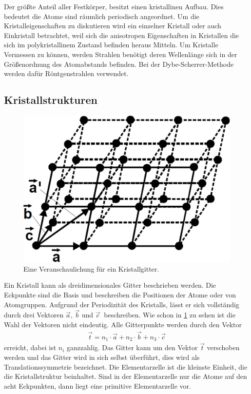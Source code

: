 Der größte Anteil aller Festkörper, besitzt einen kristallinen Aufbau. Dies bedeutet die Atome sind räumlich periodisch angeordnet. Um die Kristalleigenschaften zu diskutieren wird ein einzelner Kristall oder auch Einkristall betrachtet, weil sich die anisotropen Eigenschaften in Kristallen die sich im polykristallinem Zustand befinden heraus Mitteln. Um Kristalle Vermessen zu können, werden Strahlen benötigt deren Wellenlänge sich in der Größenordnung des Atomabstands befinden. Bei der Dybe-Scherrer-Methode werden dafür Röntgenstrahlen verwendet.
\subsection{Kristallstrukturen}
\begin{figure}[h!]
	\centering
	\includegraphics[scale = 0.4]{../Grafiken/Gitter.pdf}
	\caption{Eine Veranschaulichung für ein Kristallgitter.\cite{V41}}
	\label{fig:BeispielGitter}
\end{figure}
Ein Kristall kann als dreidimensionales Gitter beschrieben werden. Die Eckpunkte sind die Basis und beschreiben die Positionen der Atome oder von Atomgruppen.
Aufgrund der Periodizität des Kristalls, lässt er sich vollständig durch drei Vektoren $\vec{a}$, $\vec{b}$ und $\vec{c}\ $ beschreiben. Wie schon in \cref{fig:BeispielGitter} zu sehen ist die Wahl der Vektoren nicht eindeutig. Alle Gitterpunkte werden durch den Vektor 
\begin{align}
	\vec{t}= n_1\cdot \vec{a} + n_2 \cdot \vec{b} + n_3 \cdot \vec{c} \label{eq:GitterVektor}
\end{align}
erreicht, dabei ist $n_i$ ganzzahlig. Das Gitter kann um den Vektor $\vec{t}$ verschoben werden und das Gitter wird in sich selbst überführt, dies wird als Translationssymmetrie bezeichnet. Die Elementarzelle ist die kleinste Einheit, die die Kristallstruktur beinhaltet. Sind in der Elementarzelle nur die Atome auf den acht Eckpunkten, dann liegt eine primitive Elementarzelle vor.\\
